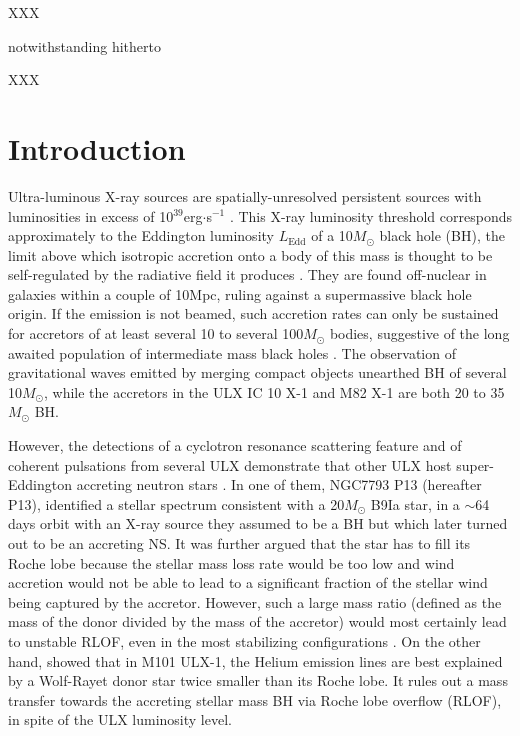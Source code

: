 \documentclass[letter]{aa}
\makeatletter
\newcommand*{\rlof}{RLOF\@\xspace}
\newcommand*{\ns}{NS\@\xspace}
\newcommand*{\bh}{BH\@\xspace}
\newcommand*{\msun}{$M_{\odot}$\@\xspace}
\newcommand*{\ledd}{$L_{\text{Edd}}$\@\xspace}
\makeatother
\begin{document}

   \maketitle
%

XXX

notwithstanding
hitherto

XXX

\section{Introduction}

Ultra-luminous X-ray sources are spatially-unresolved persistent sources with luminosities in excess of 10$^{39}$erg$\cdot$s$^{-1}$ \citep[see][for a recent review]{Kaaret2017}. This X-ray luminosity threshold corresponds approximately to the Eddington luminosity \ledd of a 10\msun black hole (\bh), the limit above which isotropic accretion onto a body of this mass is thought to be self-regulated by the radiative field it produces \citep{Rappaport2005}. They are found off-nuclear in galaxies within a couple of 10Mpc, ruling against a supermassive black hole origin. If the emission is not beamed, such accretion rates can only be sustained for accretors of at least several 10 to several 100\msun bodies, suggestive of the long awaited population of intermediate mass black holes \citep{Colbert1999}. The observation of gravitational waves emitted by merging compact objects unearthed \bh of several 10\msun, while the accretors in the ULX IC 10 X-1 \citep{Brandt1997,Prestwich2007,Silverman2008} and M82 X-1 \citep{Brightman2016} are both 20 to 35\msun \bh. 

However, the detections of a cyclotron resonance scattering feature and of coherent pulsations from several ULX demonstrate that other ULX host super-Eddington accreting neutron stars \citep[\ns][]{Bachetti2014,Furst2016,Israel2017,Carpano2018,Brightman2018}. In one of them, NGC7793 P13 (hereafter P13), \cite{Motch2014} identified a stellar spectrum consistent with a 20\msun B9Ia star, in a $\sim$64 days orbit with an X-ray source they assumed to be a \bh but which later turned out to be an accreting \ns \citep{Furst2016}. It was further argued that the star has to fill its Roche lobe because the stellar mass loss rate would be too low and wind accretion would not be able to lead to a significant fraction of the stellar wind being captured by the accretor. However, such a large mass ratio (defined as the mass of the donor divided by the mass of the accretor) would most certainly lead to unstable \rlof, even in the most stabilizing configurations \citep{Pavlovskii2017}. On the other hand, \citep{Liu2013} showed that in M101 ULX-1, the Helium emission lines are best explained by a Wolf-Rayet donor star twice smaller than its Roche lobe. It rules out a mass transfer towards the accreting stellar mass \bh via Roche lobe overflow (\rlof), in spite of the ULX luminosity level. 
\end{document}

